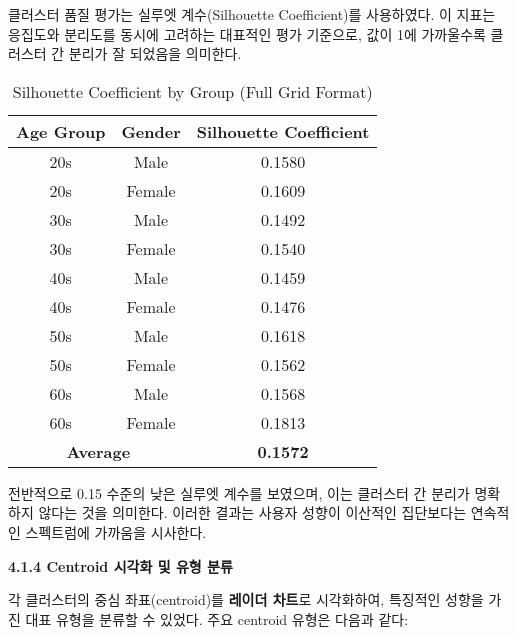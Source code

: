 \documentclass[sigconf]{acmart}
\begin{document}
\begin{CJK}{UTF8}{mj}
클러스터 품질 평가는 실루엣 계수(Silhouette Coefficient)를 사용하였다. 이 지표는 응집도와 분리도를 동시에 고려하는 대표적인 평가 기준으로, 값이 1에 가까울수록 클러스터 간 분리가 잘 되었음을 의미한다.

\begin{table}[H]
\centering
\caption{Silhouette Coefficient by Group (Full Grid Format)}
\begin{tabular}{|c|c|c|}
\hline
\textbf{Age Group} & \textbf{Gender} & \textbf{Silhouette Coefficient} \\
\hline
20s & Male   & 0.1580 \\
20s & Female & 0.1609 \\
30s & Male   & 0.1492 \\
30s & Female & 0.1540 \\
40s & Male   & 0.1459 \\
40s & Female & 0.1476 \\
50s & Male   & 0.1618 \\
50s & Female & 0.1562 \\
60s & Male   & 0.1568 \\
60s & Female & 0.1813 \\
\hline
\multicolumn{2}{|c|}{\textbf{Average}} & \textbf{0.1572} \\
\hline
\end{tabular}
\end{table}


전반적으로 0.15 수준의 낮은 실루엣 계수를 보였으며, 이는 클러스터 간 분리가 명확하지 않다는 것을 의미한다. 이러한 결과는 사용자 성향이 이산적인 집단보다는 연속적인 스펙트럼에 가까움을 시사한다.

\vspace{0.5em}
\noindent\textbf{4.1.4 Centroid 시각화 및 유형 분류}\par

각 클러스터의 중심 좌표(centroid)를 \textbf{레이더 차트}로 시각화하여, 특징적인 성향을 가진 대표 유형을 분류할 수 있었다. 주요 centroid 유형은 다음과 같다:


\end{CJK}
\end{document}

